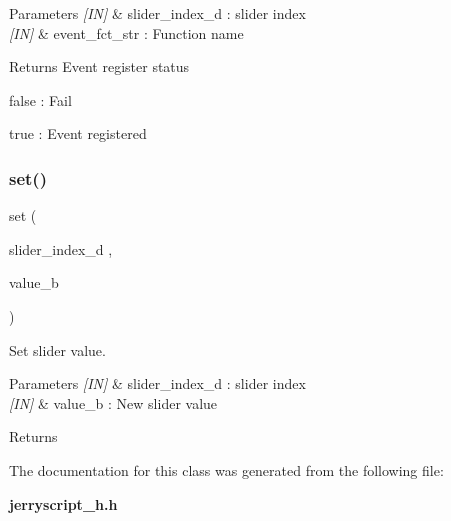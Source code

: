 \begin{DoxyParams}{Parameters}
{\em \mbox{[}\+I\+N\mbox{]}} & slider\+\_\+index\+\_\+d \+: slider index \\
\hline
{\em \mbox{[}\+I\+N\mbox{]}} & event\+\_\+fct\+\_\+str \+: Function name \\
\hline
\end{DoxyParams}
\begin{DoxyReturn}{Returns}
Event register status \begin{DoxyItemize}
\item false \+: Fail \item true \+: Event registered \end{DoxyItemize}

\end{DoxyReturn}
\mbox{\label{classslider_a537232df47b6c915ab56ad706d35d175}} 
\subsubsection{set()}
{\footnotesize\ttfamily set (\begin{DoxyParamCaption}\item[{slider\+\_\+index\+\_\+d}]{,  }\item[{value\+\_\+b}]{ }\end{DoxyParamCaption})}



Set slider value. 


\begin{DoxyCode}{0}
\end{DoxyCode}



\begin{DoxyParams}{Parameters}
{\em \mbox{[}\+I\+N\mbox{]}} & slider\+\_\+index\+\_\+d \+: slider index \\
\hline
{\em \mbox{[}\+I\+N\mbox{]}} & value\+\_\+b \+: New slider value \\
\hline
\end{DoxyParams}
\begin{DoxyReturn}{Returns}

\end{DoxyReturn}


The documentation for this class was generated from the following file\+:\begin{DoxyCompactItemize}
\item 
\textbf{ jerryscript\+\_\+h.\+h}\end{DoxyCompactItemize}

